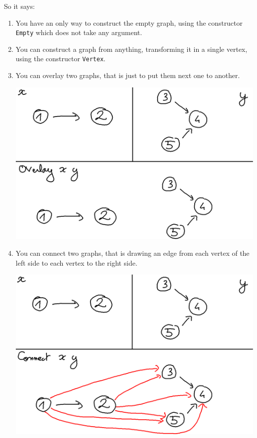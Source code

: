 \documentclass[10pt,a4paper]{article}
\begin{document}
So it says:

\begin{enumerate}
\item You have an only way to construct the empty graph, using the constructor \verb|Empty| which does not take any argument.

\item You can construct a graph from anything, transforming it in a single vertex, using the constructor \verb|Vertex|.

\item You can overlay two graphs, that is just to put them next one to another.

\begin{center}
	\includegraphics[scale=0.4]{figspng/overlay.png}
\end{center}

\item You can connect two graphs, that is drawing an edge from each vertex of the left side to each vertex to the right side.

\begin{center}
	\includegraphics[scale=0.4]{figspng/connect.png}
\end{center}

\end{enumerate}
\end{document}
